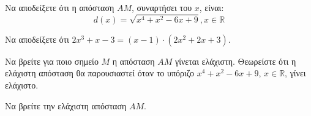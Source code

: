 \begin{alist}
    \item Να αποδείξετε ότι η απόσταση $AM$, συναρτήσει του $x$, είναι:
    \[ d(x) = \sqrt{x^4 + x^2 - 6x + 9}, x \in \mathbb{R} \]

    \item
    \begin{rlist}
        \item Να αποδείξετε ότι $2x^3 + x - 3 = (x-1) \cdot (2x^2 + 2x + 3)$.

        \item Να βρείτε για ποιο σημείο $M$ η απόσταση $AM$ γίνεται ελάχιστη. Θεωρείστε ότι η ελάχιστη απόσταση θα παρουσιαστεί όταν το υπόριζο $x^4 + x^2 - 6x + 9$, $x \in \mathbb{R}$, γίνει ελάχιστο.
    \end{rlist}

    \item Να βρείτε την ελάχιστη απόσταση $AM$.
\end{alist}

